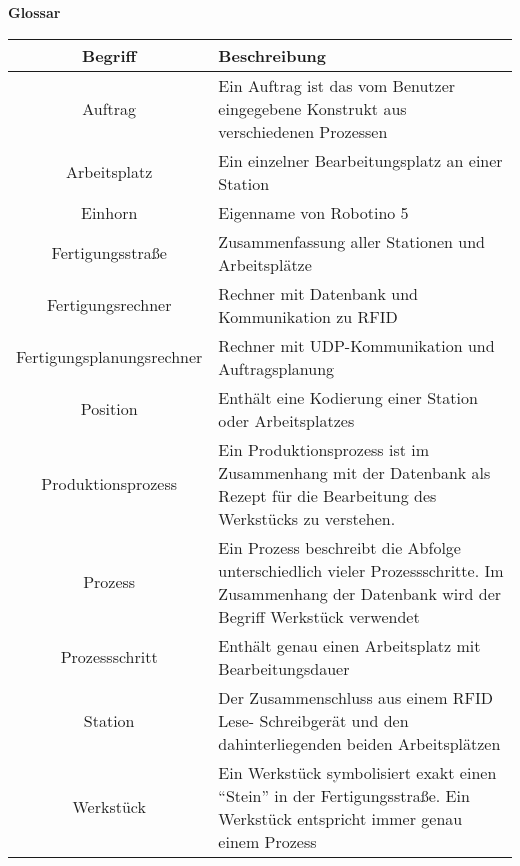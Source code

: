 \documentclass[12pt,  %
  a4paper,            %
  oneside,            %
  BCOR=5mm,           %
  parskip=half,       %
]{scrreprt}
\begin{document}
\newcommand{\inlinetodo}[1]{\todo[inline,linecolor=blue,backgroundcolor=blue!25,bordercolor=blue,size=\normalsize]{#1}}








\newpage

  \vspace{1.5cm}
  \begin{minipage}[b][0cm][b]{\textwidth}
    \fontsize{22pt}{20pt}
		\selectfont
    \begin{center}
      \textbf{Glossar}  	  
  	\end{center}
  \end{minipage}

\begin{table}[!ht]
	\centering
	\renewcommand{\arraystretch}{1.5}
	\begin{tabular}{|c|p{10cm}|}
		\hline
		\textbf{Begriff} &	\textbf{Beschreibung} \\
		\hline
    Auftrag & Ein Auftrag ist das vom Benutzer eingegebene Konstrukt aus verschiedenen Prozessen \\
		\hline
    Arbeitsplatz & Ein einzelner Bearbeitungsplatz an einer Station\\
		\hline
    Einhorn & Eigenname von Robotino 5  \\
		\hline
    Fertigungsstraße & Zusammenfassung aller Stationen und Arbeitsplätze  \\
		\hline
    Fertigungsrechner & Rechner mit Datenbank und Kommunikation zu RFID  \\
		\hline
    Fertigungsplanungsrechner & Rechner mit UDP-Kommunikation und Auftragsplanung  \\
		\hline
    Position & Enthält eine Kodierung einer Station oder Arbeitsplatzes \\
		\hline
		Produktionsprozess & Ein Produktionsprozess ist im Zusammenhang mit der Datenbank als Rezept für die Bearbeitung des Werkstücks zu verstehen. \\
		\hline
    Prozess & Ein Prozess beschreibt die Abfolge unterschiedlich vieler Prozessschritte. Im Zusammenhang der Datenbank wird der Begriff Werkstück verwendet  \\
		\hline
    Prozessschritt & Enthält genau einen Arbeitsplatz mit Bearbeitungsdauer \\
		\hline
    Station & Der Zusammenschluss aus einem RFID Lese- Schreibgerät und den dahinterliegenden beiden Arbeitsplätzen \\
		\hline
    Werkstück & Ein Werkstück symbolisiert exakt einen "`Stein"' in der Fertigungsstraße. Ein Werkstück entspricht immer genau einem Prozess\\
		\hline
	\end{tabular}
	\label{tab:Glossar}
\end{table}
\end{document}
